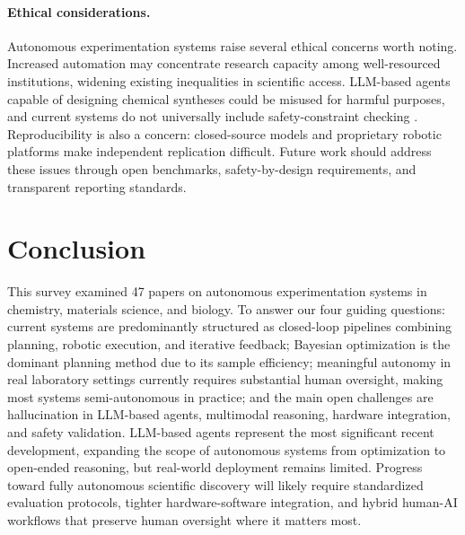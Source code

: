\documentclass{article}
\begin{document}
\paragraph{Ethical considerations.}
Autonomous experimentation systems raise several ethical concerns worth noting. Increased automation may concentrate research capacity among well-resourced institutions, widening existing inequalities in scientific access. LLM-based agents capable of designing chemical syntheses could be misused for harmful purposes, and current systems do not universally include safety-constraint checking \cite{boiko2023autonomous}. Reproducibility is also a concern: closed-source models and proprietary robotic platforms make independent replication difficult. Future work should address these issues through open benchmarks, safety-by-design requirements, and transparent reporting standards.

\section{Conclusion}
\label{sec:conclusion}

This survey examined 47 papers on autonomous experimentation systems in chemistry, materials science, and biology. To answer our four guiding questions: current systems are predominantly structured as closed-loop pipelines combining planning, robotic execution, and iterative feedback; Bayesian optimization is the dominant planning method due to its sample efficiency; meaningful autonomy in real laboratory settings currently requires substantial human oversight, making most systems semi-autonomous in practice; and the main open challenges are hallucination in LLM-based agents, multimodal reasoning, hardware integration, and safety validation. LLM-based agents represent the most significant recent development, expanding the scope of autonomous systems from optimization to open-ended reasoning, but real-world deployment remains limited. Progress toward fully autonomous scientific discovery will likely require standardized evaluation protocols, tighter hardware-software integration, and hybrid human-AI workflows that preserve human oversight where it matters most.



\end{document}
